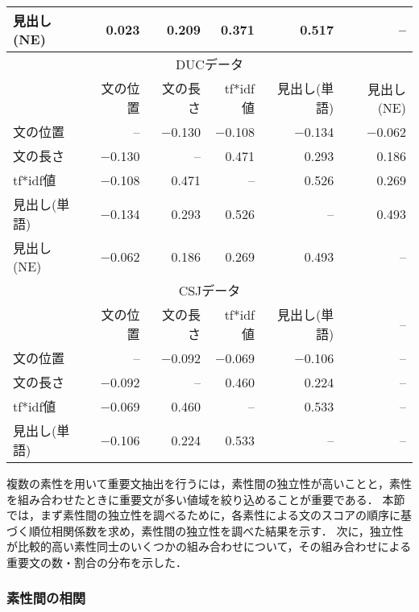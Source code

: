 \begin{table}[t]
\begin{center}
\begin{tabular}{l|rrrrr}
見出し(NE)   & 0.023    & 0.209    & 0.371    & 0.517        & --         \\ \hline \hline
\multicolumn{6}{c}{DUCデータ} \\ \hline
             & 文の位置 & 文の長さ & tf*idf値 & 見出し(単語) & 見出し(NE) \\ \hline
文の位置     & --       & $-$0.130   & $-$0.108   & $-$0.134       & $-$0.062     \\       
文の長さ     & $-$0.130   & --       & 0.471    & 0.293        & 0.186      \\       
tf*idf値     & $-$0.108   & 0.471    & --       & 0.526        & 0.269      \\       
見出し(単語) & $-$0.134   & 0.293    & 0.526    & --           & 0.493      \\       
見出し(NE)   & $-$0.062   & 0.186    & 0.269    & 0.493        & --         \\ \hline \hline
\multicolumn{6}{c}{CSJデータ} \\ \hline
             & 文の位置 & 文の長さ & tf*idf値 & 見出し(単語) & --         \\ \hline
文の位置     & --       & $-$0.092   & $-$0.069   & $-$0.106       & --         \\       
文の長さ     & $-$0.092   & --       & 0.460    & 0.224        & --         \\       
tf*idf値     & $-$0.069   & 0.460    & --       & 0.533        & --         \\       
見出し(単語) & $-$0.106   & 0.224    & 0.533    & --           & --         \\ \hline
\end{tabular}
\end{center}
\end{table}

複数の素性を用いて重要文抽出を行うには，素性間の独立性が高いことと，素性を組み合わせたときに重要文が多い値域を絞り込めることが重要である．
本節では，まず素性間の独立性を調べるために，各素性による文のスコアの順序に基づく順位相関係数を求め，素性間の独立性を調べた結果を示す．
次に，独立性が比較的高い素性同士のいくつかの組み合わせについて，その組み合わせによる重要文の数・割合の分布を示した．


\subsubsection{素性間の相関}

